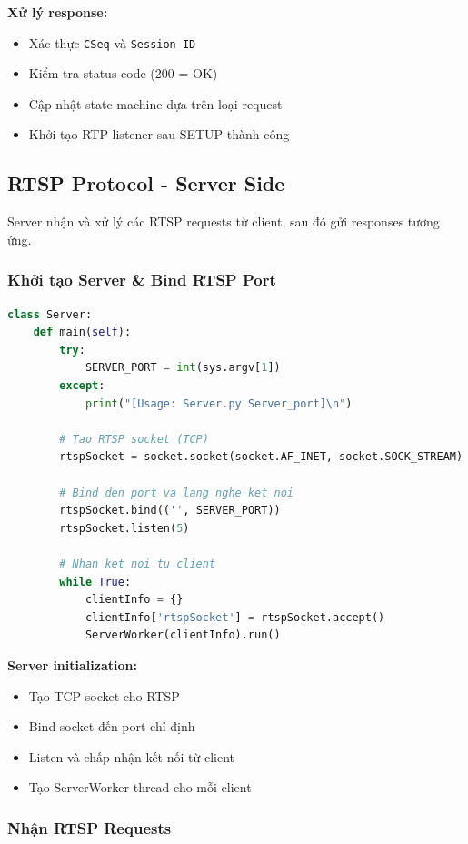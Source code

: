 \documentclass[a4paper,12pt]{article}
\begin{document}
\textbf{Xử lý response:}
\begin{itemize}
    \item Xác thực \texttt{CSeq} và \texttt{Session ID}
    \item Kiểm tra status code (200 = OK)
    \item Cập nhật state machine dựa trên loại request
    \item Khởi tạo RTP listener sau SETUP thành công
\end{itemize}

\subsection{RTSP Protocol - Server Side}

Server nhận và xử lý các RTSP requests từ client, sau đó gửi responses tương ứng.

\subsubsection{Khởi tạo Server \& Bind RTSP Port}

\begin{lstlisting}[language=Python, caption={Server Initialization}]
class Server:
    def main(self):
        try:
            SERVER_PORT = int(sys.argv[1])
        except:
            print("[Usage: Server.py Server_port]\n")

        # Tao RTSP socket (TCP)
        rtspSocket = socket.socket(socket.AF_INET, socket.SOCK_STREAM)

        # Bind den port va lang nghe ket noi
        rtspSocket.bind(('', SERVER_PORT))
        rtspSocket.listen(5)

        # Nhan ket noi tu client
        while True:
            clientInfo = {}
            clientInfo['rtspSocket'] = rtspSocket.accept()
            ServerWorker(clientInfo).run()
\end{lstlisting}

\textbf{Server initialization:}
\begin{itemize}
    \item Tạo TCP socket cho RTSP
    \item Bind socket đến port chỉ định
    \item Listen và chấp nhận kết nối từ client
    \item Tạo ServerWorker thread cho mỗi client
\end{itemize}

\subsubsection{Nhận RTSP Requests}
\end{document}
